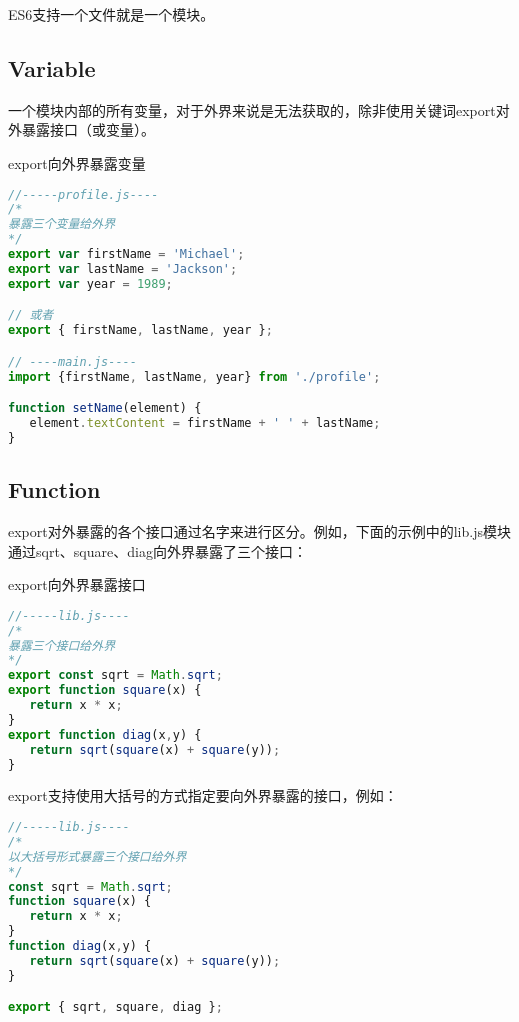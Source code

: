 ES6支持一个文件就是一个模块。






\subsection{Variable}



一个模块内部的所有变量，对于外界来说是无法获取的，除非使用关键词export对外暴露接口（或变量）。


\begin{example}
export向外界暴露变量
\begin{lstlisting}[language=JavaScript]
//-----profile.js----
/*
暴露三个变量给外界
*/
export var firstName = 'Michael';
export var lastName = 'Jackson';
export var year = 1989;

// 或者
export { firstName, lastName, year };

// ----main.js----
import {firstName, lastName, year} from './profile';

function setName(element) {
   element.textContent = firstName + ' ' + lastName;
}
\end{lstlisting}
\end{example}


\subsection{Function}


export对外暴露的各个接口通过名字来进行区分。例如，下面的示例中的lib.js模块通过sqrt、square、diag向外界暴露了三个接口：



\begin{example}
export向外界暴露接口
\begin{lstlisting}[language=JavaScript]
//-----lib.js----
/*
暴露三个接口给外界
*/
export const sqrt = Math.sqrt;
export function square(x) {
   return x * x;
}
export function diag(x,y) {
   return sqrt(square(x) + square(y));
}
\end{lstlisting}
\end{example}

export支持使用大括号的方式指定要向外界暴露的接口，例如：






\begin{lstlisting}[language=JavaScript]
//-----lib.js----
/*
以大括号形式暴露三个接口给外界
*/
const sqrt = Math.sqrt;
function square(x) {
   return x * x;
}
function diag(x,y) {
   return sqrt(square(x) + square(y));
}

export { sqrt, square, diag };
\end{lstlisting}

